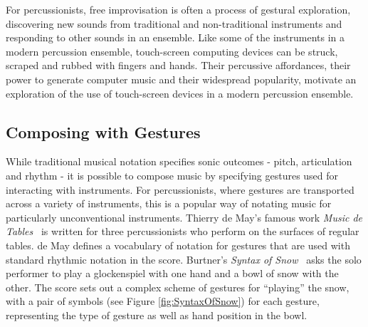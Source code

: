 \documentclass[graybox]{svmult}
\begin{document}
For percussionists, free improvisation is often a process of gestural
exploration, discovering new sounds from traditional and
non-traditional instruments and responding to other sounds in an
ensemble. Like some of the instruments in a modern percussion
ensemble, touch-screen computing devices can be struck, scraped and
rubbed with fingers and hands. Their percussive affordances, their
power to generate computer music and their widespread popularity,
motivate an exploration of the use of touch-screen devices in a modern
percussion ensemble.

\subsection{Composing with Gestures}

While traditional musical notation specifies sonic outcomes - pitch,
articulation and rhythm - it is possible to compose music by
specifying gestures used for interacting with instruments. For
percussionists, where gestures are transported across a variety of
instruments, this is a popular way of notating music for particularly
unconventional instruments. Thierry de May's famous work \emph{Music
de Tables}~\cite{May:1987fk} is written for three percussionists who
perform on the surfaces of regular tables. de May defines a vocabulary
of notation for gestures that are used with standard rhythmic notation
in the score. Burtner's \emph{Syntax of Snow}~\cite{Burtner:2011fk}
asks the solo performer to play a glockenspiel with one hand and a
bowl of snow with the other. The score sets out a complex scheme of
gestures for ``playing'' the snow, with a pair of symbols (see Figure
\ref{fig:SyntaxOfSnow}) for each gesture, representing the type of
gesture as well as hand position in the bowl.
\end{document}
